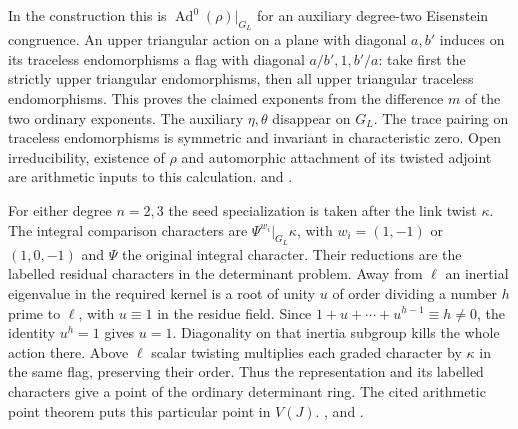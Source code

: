 In the construction this is \(\operatorname{Ad}^{0}(\rho)|_{G_L}\)
for an auxiliary degree-two Eisenstein congruence. An upper triangular
action on a plane with diagonal \(a,b'\) induces on its traceless
endomorphisms a flag with diagonal \(a/b',1,b'/a\): take first the
strictly upper triangular endomorphisms, then all upper triangular
traceless endomorphisms. This proves the claimed exponents from
the difference \(m\) of the two ordinary exponents. The auxiliary
\(\eta,\theta\) disappear on \(G_L\). The trace pairing on traceless
endomorphisms is symmetric and invariant in characteristic zero.
Open irreducibility, existence of \(\rho\) and automorphic attachment
of its twisted adjoint are arithmetic inputs to this calculation.
and .

For either degree \(n=2,3\) the seed specialization is taken after
the link twist \(\kappa\). The integral comparison characters are
\(\Psi^{w_i}|_{G_L}\kappa\), with \(w_i=(1,-1)\) or \((1,0,-1)\)
and \(\Psi\) the original integral character. Their reductions are
the labelled residual characters in the determinant problem.
Away from \(\ell\) an inertial eigenvalue in the required kernel is
a root of unity \(u\) of order dividing a number \(h\) prime to \(\ell\),
with \(u\equiv1\) in the residue field. Since
\(1+u+\cdots+u^{h-1}\equiv h\ne0\), the identity \(u^h=1\)
gives \(u=1\). Diagonality on that inertia subgroup kills the
whole action there. Above \(\ell\) scalar twisting multiplies each
graded character by \(\kappa\) in the same flag, preserving their
order. Thus the representation and its labelled characters give a
point of the ordinary determinant ring. The cited arithmetic
point theorem puts this particular point in \(V(J)\).
,
and .

